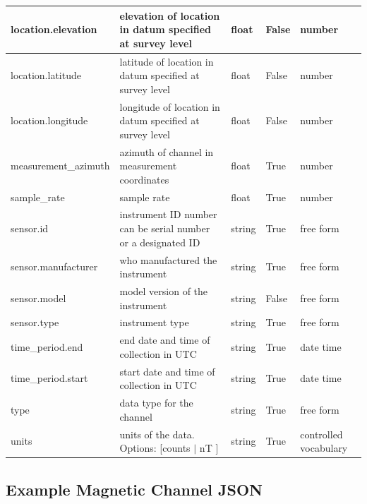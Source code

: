 \documentclass{article}
\begin{document}
\begin{table}[h!]
\begin{tabular}{|l|p{2.75in}|l|l|p{.95in}|}
	location.elevation & elevation of location in datum specified at survey level & float & False & number  \\ \hline
	location.latitude & latitude of location in datum specified at survey level & float & False & number  \\ \hline
	location.longitude & longitude of location in datum specified at survey level & float & False & number  \\ \hline
	measurement\_azimuth & azimuth of channel in measurement coordinates & float & True & number  \\ \hline
	sample\_rate & sample rate & float & True & number  \\ \hline
	sensor.id & instrument ID number can be serial number or a designated ID & string & True & free form  \\ \hline
	sensor.manufacturer & who manufactured the instrument & string & True & free form  \\ \hline
	sensor.model & model version of the instrument & string & False & free form  \\ \hline
	sensor.type & instrument type & string & True & free form  \\ \hline
	time\_period.end & end date and time of collection in UTC & string & True & date time  \\ \hline
	time\_period.start & start date and time of collection in UTC & string & True & date time  \\ \hline
	type & data type for the channel & string & True & free form  \\ \hline
	units & units of the data. Options: [counts $|$ nT ] & string & True & controlled vocabulary  \\ \hline
        \end{tabular}
    \label{tab:magnetic}
\end{table}

\newpage
\subsection{Example Magnetic Channel JSON}
\end{document}

